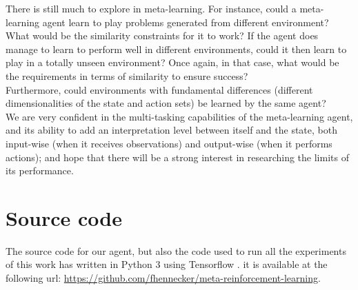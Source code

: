 There is still much to explore in meta-learning. For instance, could a 
meta-learning agent learn to play problems generated from different environment?
What would be the similarity constraints for it to work? If the agent does
manage to learn to perform well in different environments, could it then
learn to play in a totally unseen environment? Once again, in that case,
what would be the requirements in terms of similarity to ensure success?\\

Furthermore, could environments with fundamental differences (different 
dimensionalities of the state and action sets) be learned by the same agent?\\

We are very confident in the multi-tasking capabilities of the meta-learning
agent, and its ability to add an interpretation level between itself and the 
state, both input-wise (when it receives observations) and output-wise (when
it performs actions); and hope that there will be a strong interest in 
researching the limits of its performance.\\

\section{Source code}
The source code for our agent, but also the code used to run all the
experiments of this work has written in Python 3 \cite{python3} using
Tensorflow \cite{tensorflow}. it is available at the following url:
\url{https://github.com/fhennecker/meta-reinforcement-learning}.

